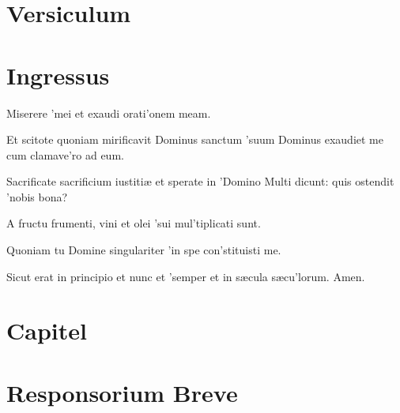\section*{Versiculum}
\section*{Ingressus}
\newpage
{}
\par
\begin{multicols}{2}\setlength{\columnseprule}{0.2px}
Miserere 'mei \grestar{} et exaudi orati'onem meam.\par
{}\par
Et scitote quoniam mirificavit Dominus sanctum 'suum \grestar{} Dominus exaudiet me cum clamave'ro ad eum.\par
{}\par
Sacrificate sacrificium iustitiæ \gredagger{} et sperate in 'Domino \grestar{} Multi dicunt: quis ostendit 'nobis bona?\par
{}\par
A fructu frumenti, vini et olei 'sui \grestar{} mul'tiplicati sunt.\par
{}\par
Quoniam tu Domine singulariter 'in spe \grestar{} con'stituisti me.\par
{}\par
Sicut erat in principio et nunc et 'semper \grestar{} et in sæcula sæcu'lorum. Amen.
\end{multicols}\par
\section*{Capitel}
\newpage
\section*{Responsorium Breve}
\par
